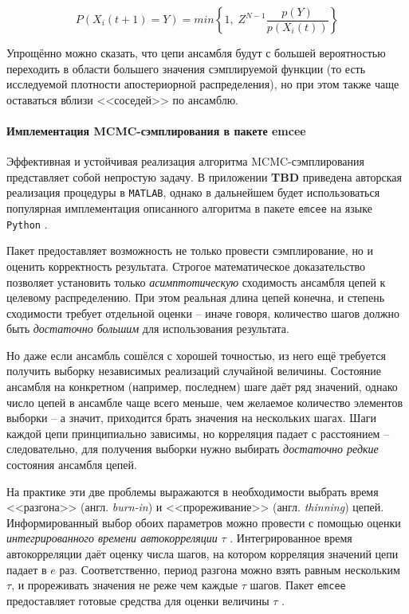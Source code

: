 \begin{equation}
	P(X_i(t + 1) = Y) = min \left\{ 1, \; Z^{N - 1} \frac{p(Y)}{p(X_i(t))} \right\}
\end{equation}

Упрощённо можно сказать, что цепи ансамбля будут с большей вероятностью переходить в области большего значения сэмплируемой функции (то есть исследуемой плотности апостериорной распределения), но при этом также чаще оставаться вблизи <<соседей>> по ансамблю.

\paragraph{Имплементация MCMC-сэмплирования в пакете emcee}

\label{sec:mcmc-implementation-details}

Эффективная и устойчивая реализация алгоритма MCMC-сэмплирования представляет собой непростую задачу. В приложении \textbf{TBD} приведена авторская реализация процедуры в \verb|MATLAB|, однако в дальнейшем будет использоваться популярная имплементация описанного алгоритма в пакете \verb|emcee| на языке \verb|Python| \cite{ForemanMackey2016}.

Пакет предоставляет возможность не только провести сэмплирование, но и оценить корректность результата. Строгое математическое доказательство позволяет установить только \textit{асимптотическую} сходимость ансамбля цепей к целевому распределению. При этом реальная длина цепей конечна, и степень сходимости требует отдельной оценки -- иначе говоря, количество шагов должно быть \textit{достаточно большим} для использования результата.

Но даже если ансамбль сошёлся с хорошей точностью, из него ещё требуется получить выборку независимых реализаций случайной величины. Состояние ансамбля на конкретном (например, последнем) шаге даёт ряд значений, однако число цепей в ансамбле чаще всего меньше, чем желаемое количество элементов выборки -- а значит, приходится брать значения на нескольких шагах. Шаги каждой цепи принципиально зависимы, но корреляция падает с расстоянием -- следовательно, для получения выборки нужно выбирать \textit{достаточно редкие} состояния ансамбля цепей.

На практике эти две проблемы выражаются в необходимости выбрать время <<разгона>> (англ. \textit{burn-in}) и <<прореживание>> (англ. \textit{thinning}) цепей. Информированный выбор обоих параметров можно провести с помощью оценки \textit{интегрированного времени автокорреляции} $\tau$ \cite{Sokal1997}. Интегрированное время автокорреляции даёт оценку числа шагов, на котором корреляция значений цепи падает в $e$ раз. Соответственно, период разгона можно взять равным нескольким $\tau$, и прореживать значения не реже чем каждые $\tau$ шагов. Пакет \verb|emcee| предоставляет готовые средства для оценки величины $\tau$ .

